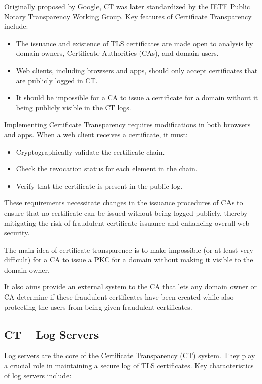 Originally proposed by Google, CT was later standardized by the IETF
Public Notary Transparency Working Group. Key features of Certificate
Transparency include:

\begin{itemize}
    \item The issuance and existence of TLS certificates are made open
      to analysis by domain owners, Certificate Authorities (CAs), and
      domain users.
    \item Web clients, including browsers and apps, should only accept
      certificates that are publicly logged in CT.
    \item It should be impossible for a CA to issue a certificate for
      a domain without it being publicly visible in the CT logs.
\end{itemize}

Implementing Certificate Transparency requires modifications in both
browsers and apps. When a web client receives a certificate, it must:

\begin{itemize}
    \item Cryptographically validate the certificate chain.
    \item Check the revocation status for each element in the chain.
    \item Verify that the certificate is present in the public log.
\end{itemize}

These requirements necessitate changes in the issuance procedures of
CAs to ensure that no certificate can be issued without being logged
publicly, thereby mitigating the risk of fraudulent certificate
issuance and enhancing overall web security.

\begin{boxH}
  The main idea of certificate transparence is to make impossible (or
  at least very difficult) for a CA to issue a PKC for a domain
  without making it visible to the domain owner.
\end{boxH}
It also aims provide an external system to the CA that lets any domain
owner or CA determine if these fraudulent certificates have been
created while also protecting the users from being given fraudulent 
certificates.

\subsection{CT – Log Servers}
Log servers are the core of the Certificate Transparency (CT) system.
They play a crucial role in maintaining a secure log of TLS
certificates. Key characteristics of log servers include:

